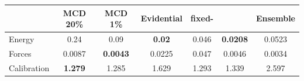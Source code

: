 \begin{tabular}{lccccc|c}
\toprule
{} & MCD 20\% & MCD 1\% & Evidential & fixed-\oursacro{} & \oursacro{} & Ensemble\\
\midrule
Energy  &   0.24 & 0.09 & \textbf{0.02} & 0.046 & \textbf{0.0208} & 0.0523\\
Forces  &   0.0087 & \textbf{0.0043} & 0.0225 & 0.047 & 0.0046 & 0.0034\\
\midrule
Calibration    &  \textbf{1.279} & 1.285 & 1.629 & 1.293 & 1.339 & 2.597 \\
\bottomrule
\end{tabular}

